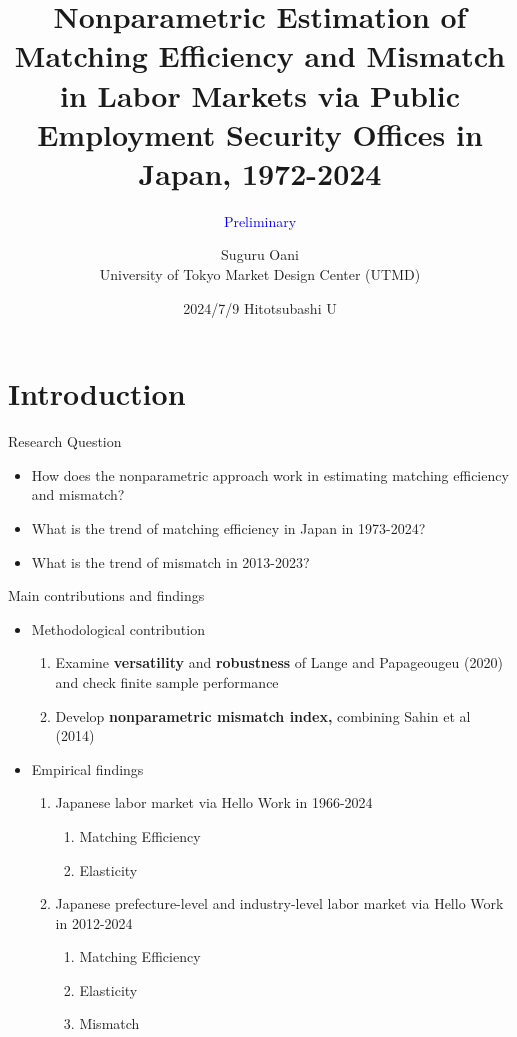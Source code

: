 \documentclass[aspectratio=169]{beamer}
\title{Nonparametric Estimation of Matching Efficiency and Mismatch in Labor Markets via Public Employment Security Offices in Japan, 1972-2024}
\date{2024/7/9 Hitotsubashi U}
\subtitle{\textcolor{blue}{Preliminary}}
\author{Suguru Oani\\ University of Tokyo Market Design Center (UTMD)}
\begin{document}
\maketitle

\section{Introduction}
\begin{frame}{Research Question}
\begin{itemize}
    \item How does the nonparametric approach work in estimating matching efficiency and mismatch?
    \item What is the trend of matching efficiency in Japan in 1973-2024?
    \item What is the trend of mismatch in 2013-2023?
\end{itemize}
\end{frame}

\begin{frame}{Main contributions and findings}
\begin{itemize}
    \item Methodological contribution
    \begin{enumerate}
        \item Examine \textbf{versatility} and \textbf{robustness} of Lange and Papageougeu (2020) and check finite sample performance
        \item Develop \textbf{nonparametric mismatch index,} combining Sahin et al (2014)
    \end{enumerate}
    \item Empirical findings
    \begin{enumerate}
        \item Japanese labor market via Hello Work in 1966-2024
        \begin{enumerate}
            \item Matching Efficiency
            \item Elasticity
        \end{enumerate}
        \item Japanese prefecture-level and industry-level labor market via Hello Work in 2012-2024
        \begin{enumerate}
            \item Matching Efficiency
            \item Elasticity
            \item Mismatch
        \end{enumerate}
    \end{enumerate}
    
\end{itemize}
\end{frame}
\end{document}
